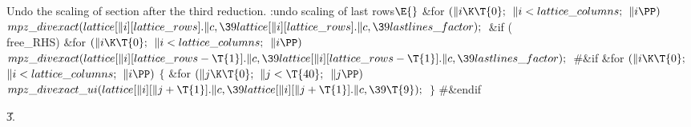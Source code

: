 Undo the scaling of section 
after the third reduction.
\Y\B\4:undo scaling of last rows\X${}\E{}$\6
\&{for} ${}(\|i\K\T{0};{}$ ${}\|i<\\{lattice\_columns};{}$ ${}\|i\PP){}$\1\5
${}\\{mpz\_divexact}(\\{lattice}[\|i][\\{lattice\_rows}].\|c,\39\\{lattice}[%
\|i][\\{lattice\_rows}].\|c,\39\\{lastlines\_factor});{}$\2\6
\&{if} (\\{free\_RHS})\1\6
\&{for} ${}(\|i\K\T{0};{}$ ${}\|i<\\{lattice\_columns};{}$ ${}\|i\PP){}$\1\5
${}\\{mpz\_divexact}(\\{lattice}[\|i][\\{lattice\_rows}-\T{1}].\|c,\39%
\\{lattice}[\|i][\\{lattice\_rows}-\T{1}].\|c,\39\\{lastlines\_factor});{}$\2\2%
\6
\8\#\&{if} \6
\&{for} ${}(\|i\K\T{0};{}$ ${}\|i<\\{lattice\_columns};{}$ ${}\|i\PP){}$\5
${}\{{}$\1\6
\&{for} ${}(\|j\K\T{0};{}$ ${}\|j<\T{40};{}$ ${}\|j\PP){}$\1\5
${}\\{mpz\_divexact\_ui}(\\{lattice}[\|i][\|j+\T{1}].\|c,\39\\{lattice}[\|i][%
\|j+\T{1}].\|c,\39\T{9});{}$\2\6
\4${}\}{}$\2\6
\8\#\&{endif}\par
\U3.\fi

